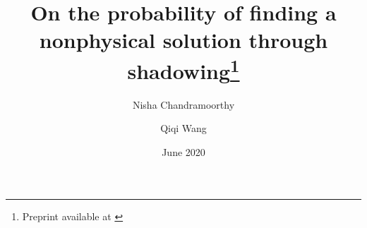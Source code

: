 %
%
%
%
%
%
\RequirePackage{fix-cm}
%
\documentclass[smallextended]{svjour3}       %
%
\smartqed  %
%
%
%
%
\usepackage[utf8]{inputenc}
\usepackage{graphicx, float}
\usepackage{amsmath, amssymb, amsfonts}
\usepackage{mathtools,hyperref}
\usepackage{xcolor,verbatim}
\newcommand{\nisha}[1]{{\color{darkgreen} #1}}
\DeclarePairedDelimiter{\floor}{\lfloor}{\rfloor}


\title{On the probability of finding a nonphysical solution through shadowing\footnote{Preprint available at \cite{preprint}}}
\date{June 2020}



\author{Nisha Chandramoorthy \and Qiqi Wang}

